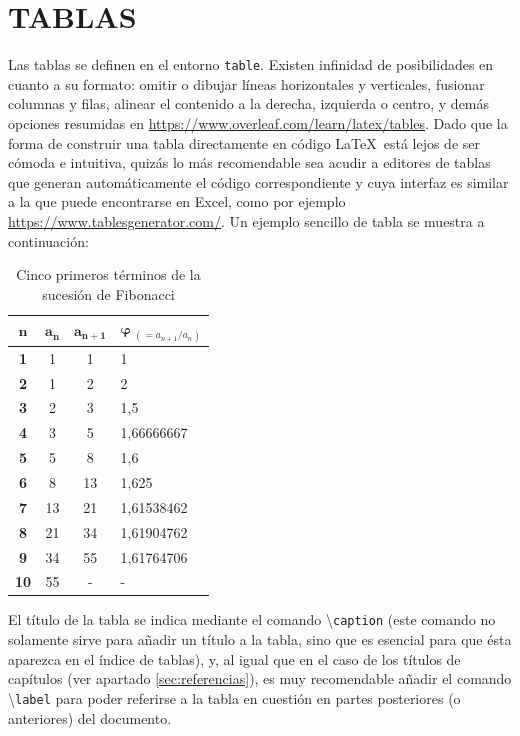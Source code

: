 
\section{TABLAS} \label{sec:tablas}

Las tablas se definen en el entorno \texttt{table}. Existen infinidad de posibilidades en cuanto a su formato: omitir o dibujar líneas horizontales y verticales, fusionar columnas y filas, alinear el contenido a la derecha, izquierda o centro, y demás opciones resumidas en \url{https://www.overleaf.com/learn/latex/tables}. Dado que la forma de construir una tabla directamente en código \LaTeX \ está lejos de ser cómoda e intuitiva, quizás lo más recomendable sea acudir a editores de tablas que generan automáticamente el código correspondiente y cuya interfaz es similar a la que puede encontrarse en Excel, como por ejemplo \url{https://www.tablesgenerator.com/}. Un ejemplo sencillo de tabla se muestra a continuación:

\vspace{25pt}

\begin{table}[H]
\centering
\begin{tabular}{|c|c|c|l|}
\hline
$\bm{n}$ & $\bm{a_n}$ & $\bm{a_{n+1}}$ & $\bm{\varphi} \ _{(= a_{n+1}/a_n)}$ \\ \hline\hline
\textbf{1} & 1 & 1 & 1 \\ \hline
\textbf{2} & 1 & 2 & 2 \\ \hline
\textbf{3} & 2 & 3 & 1,5 \\ \hline
\textbf{4} & 3 & 5 & 1,66666667 \\ \hline
\textbf{5} & 5 & 8 & 1,6 \\ \hline
\textbf{6} & 8 & 13 & 1,625 \\ \hline
\textbf{7} & 13 & 21 & 1,61538462 \\ \hline
\textbf{8} & 21 & 34 & 1,61904762 \\ \hline
\textbf{9} & 34 & 55 & 1,61764706 \\ \hline
\textbf{10} & 55 & - & - \\ \hline
\end{tabular}
\caption{Cinco primeros términos de la sucesión de Fibonacci}
\label{tabla:fibonacci5}
\end{table}

\vspace{5pt}

El título de la tabla se indica mediante el comando \textbackslash\texttt{caption} (este comando no solamente sirve para añadir un título a la tabla, sino que es esencial para que ésta aparezca en el índice de tablas), y, al igual que en el caso de los títulos de capítulos (ver apartado \ref{sec:referencias}), es muy recomendable añadir el comando \textbackslash\texttt{label} para poder referirse a la tabla en cuestión en partes posteriores (o anteriores) del documento.


